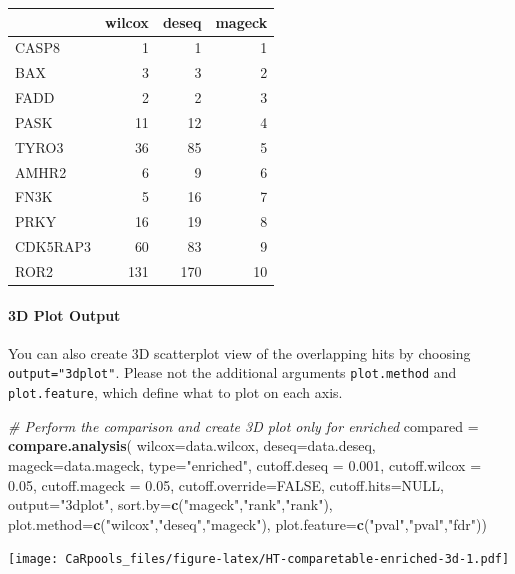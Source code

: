 \documentclass[]{article}
\newenvironment{Shaded}{\begin{snugshade}}{\end{snugshade}}
\newcommand{\KeywordTok}[1]{\textcolor[rgb]{0.13,0.29,0.53}{\textbf{{#1}}}}
\newcommand{\DataTypeTok}[1]{\textcolor[rgb]{0.13,0.29,0.53}{{#1}}}
\newcommand{\FloatTok}[1]{\textcolor[rgb]{0.00,0.00,0.81}{{#1}}}
\newcommand{\StringTok}[1]{\textcolor[rgb]{0.31,0.60,0.02}{{#1}}}
\newcommand{\CommentTok}[1]{\textcolor[rgb]{0.56,0.35,0.01}{\textit{{#1}}}}
\newcommand{\OtherTok}[1]{\textcolor[rgb]{0.56,0.35,0.01}{{#1}}}
\newcommand{\NormalTok}[1]{{#1}}
\let\oldparagraph\paragraph
\renewcommand{\paragraph}[1]{\oldparagraph{#1}\mbox{}}
\begin{document}
\begin{longtable}[c]{@{}lrrr@{}}
\toprule
& wilcox & deseq & mageck\tabularnewline
\midrule
\endhead
CASP8 & 1 & 1 & 1\tabularnewline
BAX & 3 & 3 & 2\tabularnewline
FADD & 2 & 2 & 3\tabularnewline
PASK & 11 & 12 & 4\tabularnewline
TYRO3 & 36 & 85 & 5\tabularnewline
AMHR2 & 6 & 9 & 6\tabularnewline
FN3K & 5 & 16 & 7\tabularnewline
PRKY & 16 & 19 & 8\tabularnewline
CDK5RAP3 & 60 & 83 & 9\tabularnewline
ROR2 & 131 & 170 & 10\tabularnewline
\bottomrule
\end{longtable}

\paragraph{3D Plot Output}\label{d-plot-output}

You can also create 3D scatterplot view of the overlapping hits by
choosing \texttt{output="3dplot"}. Please not the additional arguments
\texttt{plot.method} and \texttt{plot.feature}, which define what to
plot on each axis.

\begin{Shaded}
\begin{Highlighting}[]
\CommentTok{# Perform the comparison and create 3D plot only for enriched}
\NormalTok{compared =}\StringTok{ }\KeywordTok{compare.analysis}\NormalTok{( }\DataTypeTok{wilcox=}\NormalTok{data.wilcox, }\DataTypeTok{deseq=}\NormalTok{data.deseq, }\DataTypeTok{mageck=}\NormalTok{data.mageck, }\DataTypeTok{type=}\StringTok{"enriched"}\NormalTok{, }\DataTypeTok{cutoff.deseq =} \FloatTok{0.001}\NormalTok{, }\DataTypeTok{cutoff.wilcox =} \FloatTok{0.05}\NormalTok{, }\DataTypeTok{cutoff.mageck =} \FloatTok{0.05}\NormalTok{, }\DataTypeTok{cutoff.override=}\OtherTok{FALSE}\NormalTok{, }\DataTypeTok{cutoff.hits=}\OtherTok{NULL}\NormalTok{, }\DataTypeTok{output=}\StringTok{"3dplot"}\NormalTok{, }\DataTypeTok{sort.by=}\KeywordTok{c}\NormalTok{(}\StringTok{"mageck"}\NormalTok{,}\StringTok{"rank"}\NormalTok{,}\StringTok{"rank"}\NormalTok{), }\DataTypeTok{plot.method=}\KeywordTok{c}\NormalTok{(}\StringTok{"wilcox"}\NormalTok{,}\StringTok{"deseq"}\NormalTok{,}\StringTok{"mageck"}\NormalTok{), }\DataTypeTok{plot.feature=}\KeywordTok{c}\NormalTok{(}\StringTok{"pval"}\NormalTok{,}\StringTok{"pval"}\NormalTok{,}\StringTok{"fdr"}\NormalTok{))}
\end{Highlighting}
\end{Shaded}

\texttt{[image: CaRpools\_files/figure-latex/HT-comparetable-enriched-3d-1.pdf]}
\end{document}
